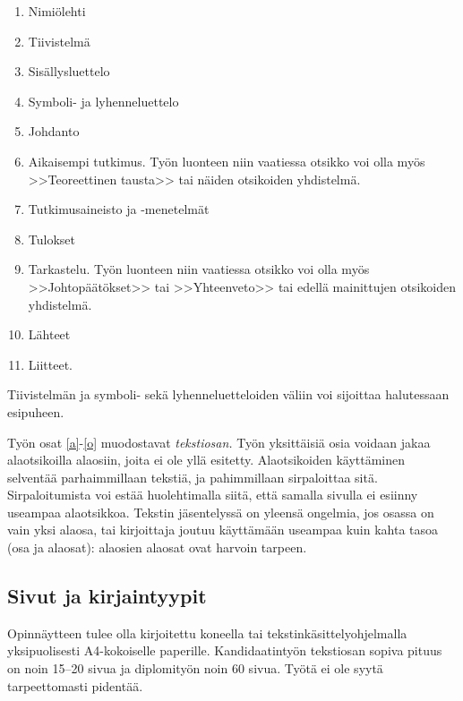 \documentclass[english,12pt,a4paper,dvips]{article}
\begin{document}
\begin{enumerate}
\item Nimiölehti
\item Tiivistelmä
\item Sisällysluettelo
\item Symboli- ja lyhenneluettelo
\item \label{a} Johdanto
\item  Aikaisempi tutkimus. Työn luonteen niin vaatiessa otsikko voi olla myös
        >>Teoreettinen tausta>>  tai näiden otsikoiden yhdistelmä.
\item Tutkimusaineisto ja -menetelmät %
\item Tulokset
\item \label{o} Tarkastelu. Työn luonteen niin vaatiessa otsikko voi
      olla myös >>Johtopäätökset>> tai >>Yhteenveto>> 
      tai edellä mainittujen otsikoiden yhdistelmä.
\item Lähteet
\item Liitteet.
\end{enumerate}

Tiivistelmän ja symboli- sekä lyhenneluetteloiden 
väliin voi sijoittaa halutessaan esipuheen.  

Työn osat \ref{a}-\ref{o} muodostavat \textit{tekstiosan.}  Työn
yksittäisiä osia voidaan jakaa alaotsikoilla alaosiin, joita ei ole
yllä esitetty. Alaotsikoiden käyttäminen selventää parhaimmillaan
tekstiä, ja pahimmillaan sirpaloittaa sitä.  Sirpaloitumista voi estää
huolehtimalla siitä, että samalla sivulla ei esiinny useampaa
alaotsikkoa.  Tekstin jäsentelyssä on yleensä ongelmia, jos osassa on
vain yksi alaosa, tai kirjoittaja joutuu käyttämään useampaa kuin
kahta tasoa (osa ja alaosat): alaosien alaosat ovat harvoin tarpeen.
\subsection*{Sivut ja kirjaintyypit}

Opinnäytteen tulee olla kirjoitettu koneella tai
tekstinkäsittelyohjelmalla yksipuolisesti A4-kokoiselle paperille.
Kandidaatintyön tekstiosan sopiva pituus on noin 15--20 sivua ja
diplomityön noin 60 sivua. Työtä ei ole syytä tarpeettomasti pidentää.
\end{document}
